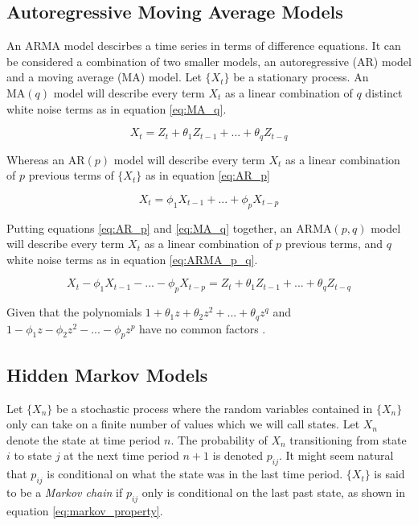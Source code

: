 \subsection{Autoregressive Moving Average Models}
An ARMA model descirbes a time series in terms of difference equations. It can be considered a combination of two smaller models, an autoregressive (AR) model and a moving average (MA) model. Let $\{X_t\}$ be a stationary process. An $\mathrm{MA}(q)$ model will describe every term $X_t$ as a linear combination of $q$ distinct white noise terms as in equation \eqref{eq:MA_q}.

\begin{equation}
    X_t = Z_{t} + \theta_1 Z_{t-1} + ... + \theta_q Z_{t-q}
    \label{eq:MA_q}
\end{equation}

Whereas an $\mathrm{AR}(p)$ model will describe every term $X_t$ as a linear combination of $p$ previous terms of $\{X_t\}$ as in equation \eqref{eq:AR_p}

\begin{equation}
    X_t = \phi_1 X_{t-1} + ... + \phi_p X_{t-p}
    \label{eq:AR_p}
\end{equation}

Putting equations \eqref{eq:AR_p} and \eqref{eq:MA_q} together, an $\mathrm{ARMA}(p,q)$ model will describe every term $X_t$ as a linear combination of $p$ previous terms, and $q$ white noise terms as in equation \eqref{eq:ARMA_p_q}.

\begin{equation}
    X_t - \phi_1 X_{t-1} - ... - \phi_p X_{t-p} = Z_{t} + \theta_1 Z_{t-1} + ... + \theta_q Z_{t-q}
    \label{eq:ARMA_p_q}
\end{equation}

Given that the polynomials $1 + \theta_1 z + \theta_2 z^2 + ... + \theta_q z^q$ and $1 - \phi_1 z - \phi_2 z^2 - ... - \phi_p z^p$ have no common factors \cite{brockwell_davis}.

\subsection{Hidden Markov Models} \label{s:hmm}
Let $\{X_n\}$ be a stochastic process where the random variables contained in $\{X_n\}$ only can take on a finite number of values which we will call states. Let $X_n$ denote the state at time period $n$. The probability of $X_n$ transitioning from state $i$ to state $j$ at the next time period $n+1$ is denoted $p_{ij}$. It might seem natural that $p_{ij}$ is conditional on what the state was in the last time period. $\{X_t\}$ is said to be a \textit{Markov chain} if $p_{ij}$ only is conditional on the last past state, as shown in equation \eqref{eq:markov_property}.

